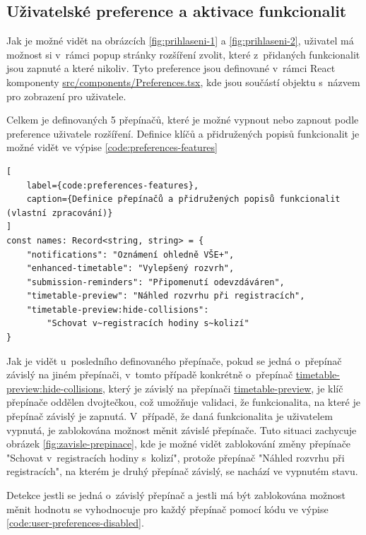 \subsection{Uživatelské preference a aktivace funkcionalit}

Jak je možné vidět na obrázcích \ref{fig:prihlaseni-1} a \ref{fig:prihlaseni-2}, uživatel má možnost si v~rámci popup stránky rozšíření zvolit, které z~přidaných funkcionalit jsou zapnuté a které nikoliv. Tyto preference jsou definované v~rámci React komponenty \url{src/components/Preferences.tsx}, kde jsou součástí objektu s~názvem pro zobrazení pro uživatele.

Celkem je definovaných 5 přepínačů, které je možné vypnout nebo zapnout podle preference uživatele rozšíření. Definice klíčů a přidružených popisů funkcionalit je možné vidět ve výpise \ref{code:preferences-features}

\begin{lstlisting}[
    label={code:preferences-features},
    caption={Definice přepínačů a přidružených popisů funkcionalit (vlastní zpracování)}
]
const names: Record<string, string> = {
    "notifications": "Oznámení ohledně VŠE+",
    "enhanced-timetable": "Vylepšený rozvrh",
    "submission-reminders": "Připomenutí odevzdáváren",
    "timetable-preview": "Náhled rozvrhu při registracích",
    "timetable-preview:hide-collisions":
        "Schovat v~registracích hodiny s~kolizí"
}
\end{lstlisting}

Jak je vidět u~posledního definovaného přepínače, pokud se jedná o~přepínač závislý na jiném přepínači, v~tomto případě konkrétně o~přepínač \url{timetable-preview:hide-collisions}, který je závislý na přepínači \url{timetable-preview}, je klíč přepínače oddělen dvojtečkou, což umožňuje validaci, že funkcionalita, na které je přepínač závislý je zapnutá. V~případě, že daná funkcionalita je uživatelem vypnutá, je zablokována možnost měnit závislé přepínače. Tuto situaci zachycuje obrázek \ref{fig:zavisle-prepinace}, kde je možné vidět zablokování změny přepínače "Schovat v~registracích hodiny s~kolizí", protože přepínač "Náhled rozvrhu při registracích", na kterém je druhý přepínač závislý, se nachází ve vypnutém stavu.

Detekce jestli se jedná o~závislý přepínač a jestli má být zablokována možnost měnit hodnotu se vyhodnocuje pro každý přepínač pomocí kódu ve výpise \ref{code:user-preferences-disabled}.

